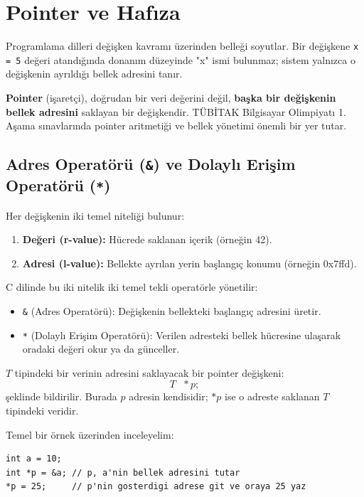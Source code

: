 \section{Pointer ve Hafıza}

Programlama dilleri değişken kavramı üzerinden belleği soyutlar. Bir değişkene \texttt{x = 5} değeri atandığında donanım düzeyinde "x" ismi bulunmaz; sistem yalnızca o değişkenin ayrıldığı bellek adresini tanır.

\textbf{Pointer} (işaretçi), doğrudan bir veri değerini değil, \textbf{başka bir değişkenin bellek adresini} saklayan bir değişkendir. TÜBİTAK Bilgisayar Olimpiyatı 1. Aşama sınavlarında pointer aritmetiği ve bellek yönetimi önemli bir yer tutar.

\subsection{Adres Operatörü (\texttt{\&}) ve Dolaylı Erişim Operatörü (\texttt{*})}

Her değişkenin iki temel niteliği bulunur:
\begin{enumerate}
    \item \textbf{Değeri (r-value):} Hücrede saklanan içerik (örneğin 42).
    \item \textbf{Adresi (l-value):} Bellekte ayrılan yerin başlangıç konumu (örneğin 0x7ffd).
\end{enumerate}

C dilinde bu iki nitelik iki temel tekli operatörle yönetilir:
\begin{itemize}
    \item \texttt{\&} (Adres Operatörü): Değişkenin bellekteki başlangıç adresini üretir.
    \item \texttt{*} (Dolaylı Erişim Operatörü): Verilen adresteki bellek hücresine ulaşarak oradaki değeri okur ya da günceller.
\end{itemize}

\begin{definition}
$T$ tipindeki bir verinin adresini saklayacak bir pointer değişkeni:
\[
T\text{ } *p;
\]
şeklinde bildirilir. Burada $p$ adresin kendisidir; $*p$ ise o adreste saklanan $T$ tipindeki veridir.
\end{definition}

Temel bir örnek üzerinden inceleyelim:
\begin{lstlisting}[language=CTemel]
int a = 10;
int *p = &a; // p, a'nin bellek adresini tutar
*p = 25;     // p'nin gosterdigi adrese git ve oraya 25 yaz
\end{lstlisting}

